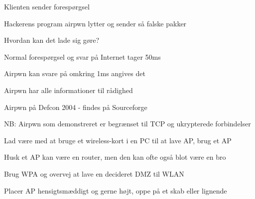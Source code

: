 \documentclass[Screen16to9,17pt]{foils}
\begin{document}





\begin{list1}
\item Klienten sender forespørgsel
\item Hackerens program airpwn lytter og sender så falske pakker
\item Hvordan kan det lade sig gøre?
\begin{list2}
\item Normal forespørgsel og svar på Internet tager 50ms
\item Airpwn kan svare på omkring 1ms angives det
\item Airpwn har alle informationer til rådighed
\end{list2}
\item Airpwn på Defcon 2004 - findes på Sourceforge\\
\item NB: Airpwn som demonstreret er begrænset til TCP og ukrypterede
  forbindelser
\end{list1}



\begin{list1}
\item Lad være med at bruge et wireless-kort i en PC til at lave AP, brug et AP
\item Husk et AP kan være en router, men den kan ofte også blot være en bro
\item Brug WPA og overvej at lave en decideret DMZ til WLAN
\item Placer AP hensigtsmæddigt og gerne højt, oppe på et skab eller lignende
\end{list1}

\end{document}
